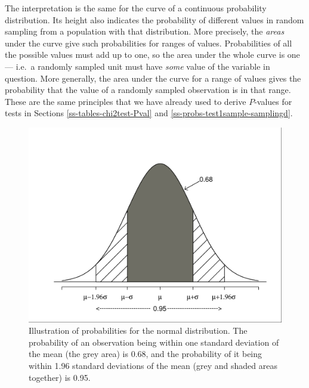 \documentclass[11pt,a4paper,openany]{book}
\begin{document}
The interpretation is the same for the curve of a continuous probability
distribution. Its height also indicates the probability of different
values in random sampling from a population with that distribution. More
precisely, the \emph{areas} under the curve give such probabilities for
ranges of values. Probabilities of all the possible values must add up
to one, so the area under the whole curve is one --- i.e.~a randomly
sampled unit must have \emph{some} value of the variable in question.
More generally, the area under the curve for a range of values gives the
probability that the value of a randomly sampled observation is in that
range. These are the same principles that we have already used to derive
\(P\)-values for tests in Sections \ref{ss-tables-chi2test-Pval} and
\ref{ss-probs-test1sample-samplingd}.

\begin{figure}[htbp]
\centering
\includegraphics[width=12.00000cm]{norm1.pdf}
\caption{\label{fig:f-norm1} Illustration of probabilities for the normal
distribution. The probability of an observation being within one
standard deviation of the mean (the grey area) is 0.68, and the
probability of it being within 1.96 standard deviations of the mean
(grey and shaded areas together) is 0.95.}
\end{figure}
\end{document}
